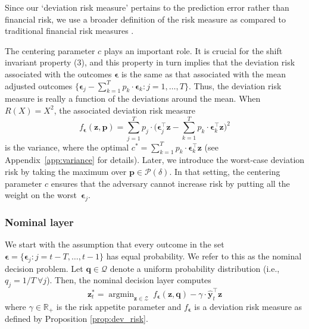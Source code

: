 \documentclass[10pt, twocolumn]{article}
\theoremstyle{plain}
\theoremstyle{definition}
\DeclareMathOperator*{\argmin}{argmin}
\begin{document}
Since our `deviation risk measure' pertains to the prediction error rather 
than financial risk, we use a broader definition of the risk measure as 
compared to traditional financial risk measures
\citep[e.g., see][]{rockafellar2006generalized}.

The centering parameter \(c\) plays an important role. It is crucial for
the shift invariant property (3), and this property in turn implies that
the deviation risk associated with the outcomes \(\bm{\epsilon}\) is the
same as that associated with the mean adjusted outcomes \(\{\bm{\epsilon}_j
- \sum_{k=1}^T p_k\cdot \bm{\epsilon}_k: j = 1, \ldots, T\}\). Thus, the
deviation risk measure is really a function of the deviations around the
mean. When \(R(X) = X^2\), the associated deviation risk measure
\[
    f_{\bm{\epsilon}}(\bm{z}, \bm{p}) = \sum_{j=1}^T p_j\cdot
    \bigg(\bm{\epsilon}_j^\top \bm{z} - \sum_{k=1}^T p_{k}\cdot
    \bm{\epsilon}_{k}^\top \bm{z}\bigg)^2
\]
is the variance, where the optimal 
\(c^* = \sum_{k=1}^T p_{k}\cdot\bm{\epsilon}_{k}^\top \bm{z}\) (see 
Appendix~\ref{app:variance} for details). Later, we introduce the worst-case 
deviation risk by taking the maximum over \(\bm{p} \in \mathcal{P}({\delta})\). 
In that setting, the centering parameter \(c\) ensures that the adversary 
cannot increase risk by putting all the weight on the 
worst~\(\bm{\epsilon}_j\).

\subsubsection{Nominal layer}

We start with the assumption that every outcome in
the set \(\bm{\epsilon} = \{\bm{\epsilon}_j : j = t-T, \ldots, t-1\}\) 
has equal probability. We refer to this as the nominal decision problem.
Let \(\bm{q}\in\mathcal{Q}\) denote a uniform probability distribution
(i.e., \(q_j = 1/T\ \forall j\)). Then, the nominal decision layer
computes 
\begin{equation}
\label{eq:nom_opt}
	\bm{z}_{t}^* = \argmin_{\bm{z}\in\mathcal{Z}}\
        f_{\bm{\epsilon}}(\bm{z}, \bm{q}) - \gamma\cdot
        \hat{\bm{y}}_{t}^\top \bm{z} 
\end{equation}
where \(\gamma \in\mathbb{R}_+\) is the risk appetite parameter and
\(f_{\bm{\epsilon}}\) is a deviation risk measure as defined by
Proposition \ref{prop:dev_risk}.   
\end{document}
